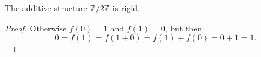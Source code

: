 \begin{theorem}
	\label{thm:rigid}
	\leanok
	The additive structure $\mathbb Z/ 2\mathbb Z$ is rigid.
\end{theorem}
\begin{proof}
	Otherwise $f(0)=1$ and $f(1)=0$, but then
	\[
	0=f(1)=f(1+0)=f(1)+f(0)=0+1=1.
	\]
\end{proof}


